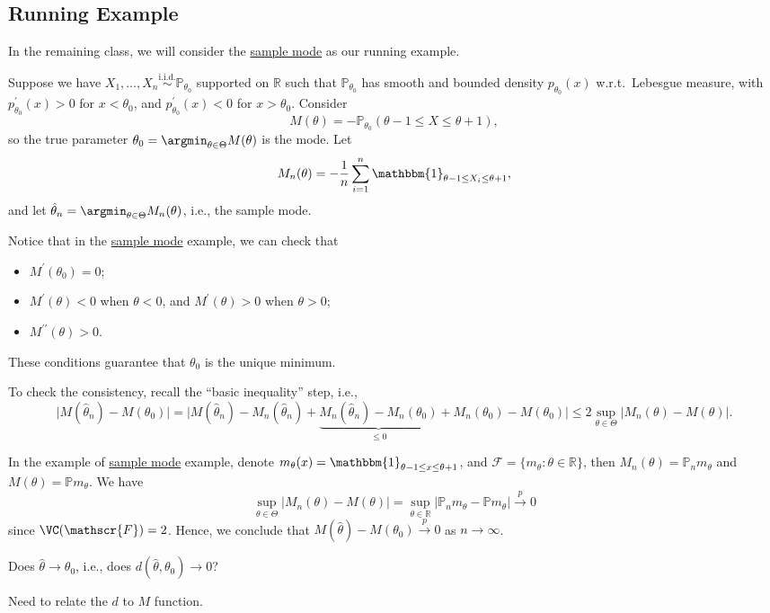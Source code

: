 \subsection{Running Example}
In the remaining class, we will consider the \hyperref[prb:sample-mode]{sample mode} as our running example.

\begin{problem}\label{prb:sample-mode}
Suppose we have \(X_1, \dots , X_n \overset{\text{i.i.d.} }{\sim } \mathbb{P} _{\theta _0}\) supported on \(\mathbb{R} \) such that \(\mathbb{P} _{\theta _0}\) has smooth and bounded density \(p_{\theta _0} (x)\) w.r.t.\ Lebesgue measure, with \(p^{\prime} _{\theta _0} (x) > 0\) for \(x < \theta _0\), and \(p^{\prime} _{\theta _0} (x) < 0\) for \(x > \theta _0\). Consider
\[
	M(\theta ) = -\mathbb{P} _{\theta _0}(\theta -1 \leq X \leq \theta +1),
\]
so the true parameter \(\theta _0 = \argmin_{\theta \in \Theta } M(\theta )\) is the mode. Let
\[
	M_n(\theta ) = -\frac{1}{n} \sum_{i=1}^{n} \mathbbm{1}_{\theta -1 \leq X_i \leq \theta +1},
\]
and let \(\hat{\theta} _n = \argmin_{\theta \in \Theta } M_n(\theta )\), i.e., the sample mode.
\end{problem}

\begin{remark}
	Notice that in the \hyperref[prb:sample-mode]{sample mode} example, we can check that
	\begin{itemize}
		\item \(M^{\prime} (\theta _0) = 0\);
		\item \(M^{\prime} (\theta ) < 0\) when \(\theta < 0\), and \(M^{\prime} (\theta ) > 0\) when \(\theta > 0\);
		\item \(M^{\prime\prime} (\theta ) > 0\).
	\end{itemize}
	These conditions guarantee that \(\theta _0\) is the unique minimum.
\end{remark}

To check the consistency, recall the ``basic inequality'' step, i.e.,
\[
	\vert M(\hat{\theta} _n) - M(\theta _0) \vert
	= \vert M(\hat{\theta} _n) - M_n(\hat{\theta} _n) + \underbrace{M_n(\hat{\theta} _n) - M_n(\theta _0)}_{\leq 0} + M_n(\theta _0) - M(\theta _0) \vert
	\leq 2 \sup _{\theta \in \Theta } \vert M_n(\theta ) - M(\theta ) \vert.
\]

In the example of \hyperref[prb:sample-mode]{sample mode} example, denote \(m_\theta (x) = \mathbbm{1}_{\theta -1 \leq x \leq \theta +1} \), and \(\mathscr{F} = \{ m_\theta \colon \theta \in \mathbb{R} \} \), then \(M_n(\theta ) = \mathbb{P} _n m_\theta \) and \(M(\theta ) = \mathbb{P} m_\theta \). We have
\[\sup _{\theta \in \Theta } \vert M_n(\theta ) - M(\theta ) \vert
	= \sup _{\theta \in \mathbb{R} }\vert \mathbb{P} _n m_\theta - \mathbb{P} m_\theta  \vert
	\overset{p}{\to } 0
\]
since \(\VC(\mathscr{F} ) = 2\). Hence, we conclude that \(M(\hat{\theta} ) - M(\theta _0) \overset{p}{\to } 0\) as \(n \to \infty \).

\begin{problem*}
	Does \(\hat{\theta} \to \theta _0\), i.e., does \(d(\hat{\theta} , \theta _0) \to 0\)?
\end{problem*}
\begin{answer}
	Need to relate the \(d\) to \(M\) function.
\end{answer}